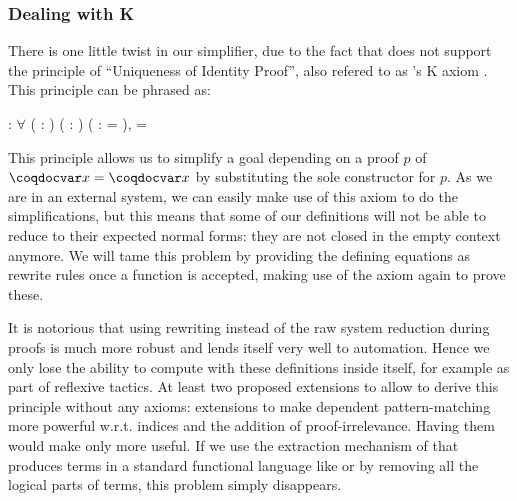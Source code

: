

\subsubsection{Dealing with K}
\label{sec:dealing-with-k}

There is one little twist in our simplifier, due to the fact that \Coq does
not support the principle of ``Uniqueness of Identity Proof'', also
refered to as 's K axiom \cite{Streicher}. This
principle can be phrased as:

: \ensuremath{\forall} ( : ) (
: ) ( :  =
),  = 

This principle allows us to simplify a goal depending on a proof $p$ of
$\var{x} = \var{x}$ by substituting the sole constructor  for
$p$. As we are in an external system, we can easily make use of this
axiom to do the simplifications, but this means that some of our
definitions will not be able to reduce to their expected normal forms: 
they are not closed in the empty context anymore. We will tame this
problem by providing the defining equations as rewrite rules
once a function is accepted, making use of the axiom again to prove
these. 

It is notorious that using rewriting instead of the raw system reduction
during proofs is much more robust and lends itself very well to
automation. Hence we only lose the ability to compute with these
definitions inside \Coq itself, for example as part of reflexive
tactics. At least two proposed extensions to \Coq allow to derive this
principle without any axioms: extensions to make dependent
pattern-matching more powerful w.r.t. indices \cite{TYPES09} and 
the addition of proof-irrelevance. Having them would make \Equations
only more useful.
If we use the extraction mechanism of \Coq \cite{Let2008} that produces
terms in a standard functional language like \ML or \Haskell by removing
all the logical parts of terms, this problem simply disappears.


